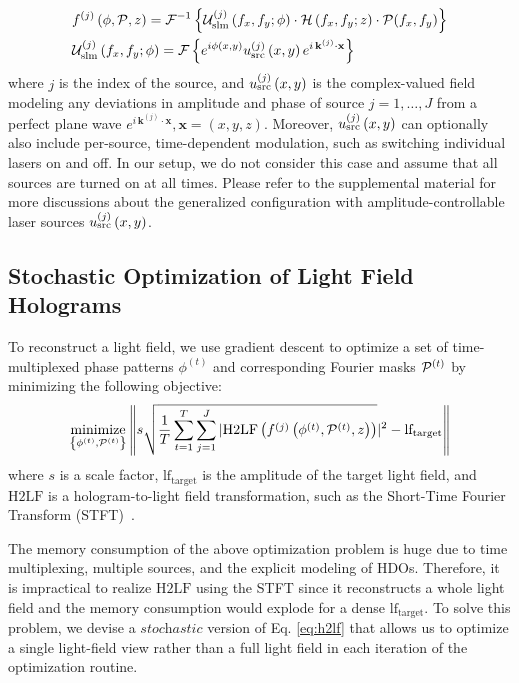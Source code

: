 \begin{align}
    & f^{(j)} \left(\phi, \mathcal{P}, z \right) = 
    \mathcal{F}^{-1} \left\{ \mathcal{U}_\text{slm}^{(j)} \left(f_x, f_y; \phi \right) \cdot \mathcal{H} \left(f_x, f_y; z \right) \cdot \mathcal{P}(f_x, f_y) \right\} \nonumber \\     
    & \mathcal{U}_\text{slm}^{(j)} \left(f_x, f_y ; \phi \right) = \mathcal{F} \left\{ e^{i\phi \left(x, y \right)} u_\text{src}^{(j)} \left(x, y \right) e^{i \, \mathbf{k}^{(j)} \cdot \mathbf{x}}\right\}
\label{eq:multi}
\end{align}
%
where $j$ is the index of the source, 
and $u_\text{src}^{(j)} \left(x, y \right)$ is the complex-valued field modeling any deviations in amplitude and phase of source $j=1, \dots, J$ from a perfect plane wave $e^{i \, \mathbf{k}^{(j)} \cdot \mathbf{x}}, \mathbf{x} = (x,y,z)$. Moreover, $u_\text{src}^{(j)} \left(x, y \right)$ can optionally also include per-source, time-dependent modulation, such as switching individual lasers on and off. In our setup, we do not consider this case and assume that all sources are turned on at all times. Please refer to the supplemental material for more discussions about the generalized configuration with amplitude-controllable laser sources $u_\text{src}^{(j)} \left(x, y \right)$.



\subsection{Stochastic Optimization of Light Field Holograms}

To reconstruct a light field, we use gradient descent to optimize a set of time-multiplexed phase patterns $\phi^{(t)}$ and corresponding Fourier masks $\mathcal{P}^{(t)}$ by minimizing the following objective:
\begin{equation}
    \underset{\left\{\phi^{(t)}, \mathcal{P}^{(t)} \right\}}{\textrm{minimize}} \left  \lVert s \sqrt{\frac{1}{T}\sum_{t=1}^{T} \sum_{j=1}^{J} |\text{H2LF}\left( f^{(j)} \left(\phi^{(t)}, \mathcal{P}^{(t)}, z\right) \right)}|^2 - \textrm{lf}_\text{target} \right \rVert 
\label{eq:h2lf}
\end{equation}
where $s$ is a scale factor, $\textrm{lf}_\text{target}$ is the amplitude of the target light field, and $\text{H2LF}$ is a hologram-to-light field transformation, such as the Short-Time Fourier Transform (STFT)~\cite{zhang2009wigner,padmanaban2019olas}. 

The memory consumption of the above optimization problem is huge due to time multiplexing, multiple sources, and the explicit modeling of HDOs. Therefore, it is impractical to realize $\text{H2LF}$ using the STFT since it reconstructs a whole light field and the memory consumption would explode for a dense $\text{lf}_\text{target}$. To solve this problem, we devise a $\textit{stochastic}$ version of Eq. \ref{eq:h2lf} that allows us to optimize a single light-field view rather than a full light field in each iteration of the optimization routine. 

